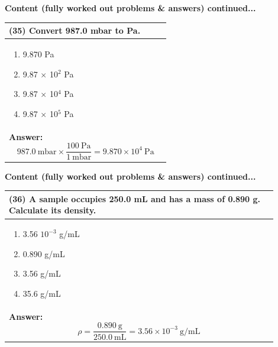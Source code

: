 \documentclass{article}
\begin{document}
\newpage
\noindent
{\large\textbf{Content (fully worked out problems \& answers) continued...}}\\[0.2em]
\vspace{0.2cm}
\begin{tabular}{|p{0.9\linewidth}|}
\hline
\vspace{0.2cm}
\textbf{(35)} Convert 987.0 mbar to Pa.\\
\hline
\vspace{0.2cm}
\begin{minipage}[t]{0.85\linewidth}
\begin{enumerate}[label=\alph*.]
\item 9.870 Pa \
\item 9.87 $\times$ 10$^2$ Pa \
\item 9.87 $\times$ 10$^4$ Pa \
\item 9.87 $\times$ 10$^5$ Pa
\end{enumerate}
\end{minipage} \\
\hline
\vspace{0.2cm}
\textbf{Answer:} 
\[
987.0~\text{mbar} \times \frac{100~\text{Pa}}{1~\text{mbar}} = 9.870 \times 10^4~\text{Pa}
\] \\ 
\hline
\end{tabular}

\newpage
\noindent
{\large\textbf{Content (fully worked out problems \& answers) continued...}}\\[0.2em]
\vspace{0.2cm}
\begin{tabular}{|p{0.9\linewidth}|}
\hline
\vspace{0.2cm}
\textbf{(36)} A sample occupies 250.0 mL and has a mass of 0.890 g. Calculate its density.\\
\hline
\vspace{0.2cm}
\begin{minipage}[t]{0.85\linewidth}
\begin{enumerate}[label=\alph*.]
\item 3.56 \times $10^{-3}$ g/mL \
\item 0.890 g/mL \
\item 3.56 g/mL \
\item 35.6 g/mL
\end{enumerate}
\end{minipage}\\
\hline
\vspace{0.2cm}
\textbf{Answer:} 
\[
\rho = \frac{0.890~\text{g}}{250.0~\text{mL}} = 3.56 \times 10^{-3}~\text{g/mL}
\] \\ 
\hline
\end{tabular}
\end{document}
